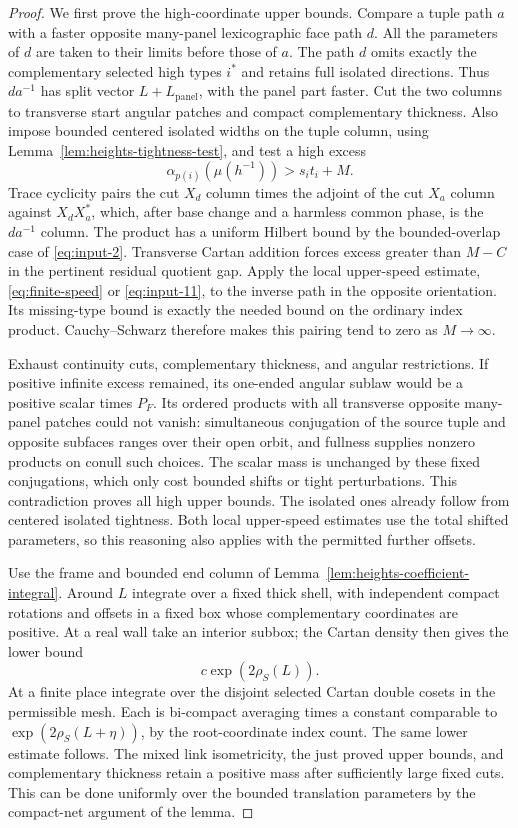 \begin{proof}
We first prove the high-coordinate upper bounds.  Compare a tuple path
$a$ with a faster opposite many-panel lexicographic face path $d$.
All the parameters of $d$ are taken to their limits before those of $a$.
The path $d$ omits exactly
the complementary selected high types $i^*$ and retains full isolated
directions.  Thus $da^{-1}$ has split vector
$L+L_{\mathrm{panel}}$, with the panel part faster.  Cut the two columns to
transverse start angular patches and compact complementary thickness.
Also impose bounded centered isolated widths on the tuple column, using
Lemma~\ref{lem:heights-tightness-test}, and test a high excess
\[
 \alpha_{p(i)}(\mu(h^{-1}))>s_i t_i+M.
\]
Trace cyclicity pairs the cut $X_d$ column times the adjoint of the cut
$X_a$ column against $X_dX_a^*$, which, after base change and a harmless
common phase, is the $da^{-1}$ column.  The product has a uniform Hilbert
bound by the bounded-overlap case of \eqref{eq:input-2}.  Transverse Cartan
addition forces excess greater than $M-C$ in the pertinent residual
quotient gap.  Apply the local upper-speed estimate, \eqref{eq:finite-speed} or
\eqref{eq:input-11}, to the inverse path in the opposite orientation. Its missing-type bound
is exactly the needed bound on the
ordinary index product.  Cauchy--Schwarz therefore makes this pairing tend
to zero as $M\to\infty$.

Exhaust continuity cuts, complementary thickness, and angular restrictions.
If positive infinite excess remained, its one-ended angular sublaw would
be a positive scalar times $P_F$.  Its ordered products with all transverse
opposite many-panel patches could not vanish: simultaneous conjugation of
the source tuple and opposite subfaces ranges over their open orbit, and
fullness supplies nonzero products on conull such choices.  The scalar
mass is unchanged by these fixed conjugations, which only cost bounded
shifts or tight perturbations.  This contradiction proves all high upper
bounds.  The isolated ones already follow from centered isolated
tightness. Both local upper-speed estimates use the total shifted
parameters, so
this reasoning also applies with the permitted further offsets.

Use the frame and bounded end column of
Lemma~\ref{lem:heights-coefficient-integral}.  Around $L$ integrate over a
fixed thick shell, with independent compact rotations and offsets in a
fixed box whose complementary coordinates are positive.  At a real wall
take an interior subbox; the Cartan density then gives the lower bound
\[
 c\exp(2\rho_S(L)).
\]
At a finite place integrate over the disjoint selected Cartan double cosets
in the permissible mesh.  Each is bi-compact averaging times a constant
comparable to $\exp(2\rho_S(L+\eta))$, by the root-coordinate index count.
The same lower estimate follows.  The mixed link isometricity, the just
proved upper bounds, and complementary thickness retain a positive mass
after sufficiently large fixed cuts.  This can be done uniformly over the
bounded translation parameters by the compact-net argument of the lemma.


\end{proof}
